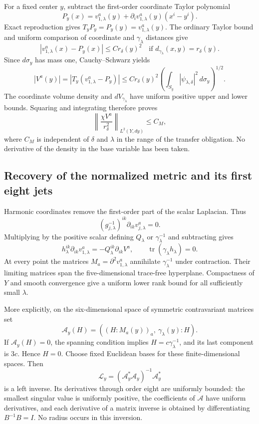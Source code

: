 \documentclass[11pt]{article}
\theoremstyle{definition}
\theoremstyle{remark}
\numberwithin{equation}{section}
\begin{document}
For a fixed center $y$, subtract the first-order coordinate Taylor
polynomial
\[
 P_y(x)=v_{1,\lambda}^a(y)
                +\partial_iv_{1,\lambda}^a(y)(x^i-y^i).
\]
Exact reproduction gives $T_yP_y=P_y(y)=v_{1,\lambda}^a(y)$.
The ordinary Taylor bound and uniform comparison of coordinate and
$\gamma_\lambda$ distances give
\[
 |v_{1,\lambda}^a(x)-P_y(x)|\leq C r_\delta(y)^2
       \quad\text{if }d_{\gamma_\lambda}(x,y)=r_\delta(y).
\]
Since $d\sigma_y$ has mass one, Cauchy--Schwarz yields
\[
 |V^a(y)|=|T_y(v_{1,\lambda}^a-P_y)|
  \leq C r_\delta(y)^2
               \left(\int_{S_y}|\psi_{\lambda,\delta}|^2
                         \,d\sigma_y\right)^{1/2}.
\]
The coordinate volume density and $dV_{\gamma_\lambda}$ have uniform
positive upper and lower bounds.  Squaring and integrating therefore
proves
\begin{equation}
 \left\|\frac{\chi V^a}{r_\delta^2}\right\|_{L^2(Y,dy)}\leq C_M,
 \label{bootstrap-expanded:moment-bound}
\end{equation}
where $C_M$ is independent of $\delta$ and $\lambda$ in the range of
the transfer obligation.  No derivative of the density in the base
variable has been taken.

\subsection{Recovery of the normalized metric and its first eight jets}
\label{bootstrap-expanded:metric}

Harmonic coordinates remove the first-order part of the scalar
Laplacian.  Thus
\[
 (g_{j,\lambda}^{-1})^{ik}\partial_{ik}v_{j,\lambda}^a=0.
\]
Multiplying by the positive scalar defining $Q_\lambda$ or
$\gamma_\lambda^{-1}$ and subtracting gives
\begin{equation}
 h_\lambda^{ik}\partial_{ik}v_{1,\lambda}^a
       =-Q_\lambda^{ik}\partial_{ik}V^a,
 \qquad \operatorname{tr}(\gamma_\lambda h_\lambda)=0.
 \label{bootstrap-expanded:linear-system}
\end{equation}
At every point the matrices
$M_a=\partial^2v_{1,\lambda}^a$ annihilate
$\gamma_\lambda^{-1}$ under contraction.  Their limiting matrices
span the five-dimensional trace-free hyperplane.  Compactness of $Y$
and smooth convergence give a uniform lower rank bound for all
sufficiently small $\lambda$.

More explicitly, on the six-dimensional space of symmetric
contravariant matrices set
\[
 \mathcal A_y(H)=((H:M_a(y))_a,\ \gamma_\lambda(y):H).
\]
If $\mathcal A_y(H)=0$, the spanning condition implies
$H=c\gamma_\lambda^{-1}$, and its last component is $3c$.
Hence $H=0$.  Choose fixed Euclidean bases for these finite-dimensional
spaces.  Then
\[
 \mathcal L_y=(\mathcal A_y^*\mathcal A_y)^{-1}\mathcal A_y^*
\]
is a left inverse.  Its derivatives through order eight are uniformly
bounded: the smallest singular value is uniformly positive, the
coefficients of $\mathcal A$ have uniform derivatives, and each
derivative of a matrix inverse is obtained by differentiating
$B^{-1}B=I$.  No radius occurs in this inversion.
\end{document}
